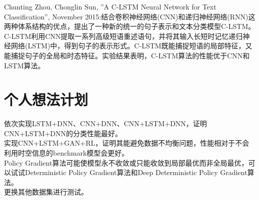 \documentclass[11pt,a4paper]{ctexart}
\begin{document}
Chunting Zhou, Chonglin Sun, ”A C-LSTM Neural Network for Text Classification”, November 2015:结合卷积神经网络(CNN)和递归神经网络(RNN)这两种体系结构的优点，提出了一种新的统一的句子表示和文本分类模型C-LSTM。C-LSTM利用CNN提取一系列高级短语重述语句，并将其输入长短时记忆递归神经网络(LSTM)中，得到句子的表示形式。C-LSTM既能捕捉短语的局部特征，又能捕捉句子的全局和时态特征。实验结果表明，C-LSTM算法的性能优于CNN和LSTM算法。

\section{个人想法计划}
\noindent 依次实现LSTM+DNN、CNN+DNN、CNN+LSTM+DNN，证明CNN+LSTM+DNN的分类性能最好。\\
实现CNN+LSTM+GAN+RL，证明其能避免数据不均衡问题，性能相对于不会利用时空信息的benchmark模型会更好。\\
Policy Gradient算法可能使模型永不收敛或只能收敛到局部最优而非全局最优，可以试试Deterministic Policy Gradient算法和Deep Deterministic Policy Gradient算法。\\
更换其他数据集进行测试。
	
\end{document}
